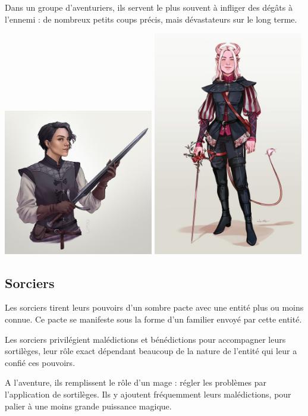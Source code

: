 \documentclass[10pt,a4paper]{book}
\begin{document}
Dans un groupe d'aventuriers, ils servent le plus souvent à infliger des dégâts à l'ennemi : de nombreux petits coups précis, mais dévastateurs sur le long terme.

\includegraphics[width=0.49\textwidth]{bretteru 1}
\includegraphics[width=0.49\textwidth]{bretteur 2}
\subsection{Sorciers}
Les sorciers tirent leurs pouvoirs d'un sombre pacte avec une entité plus ou moins connue. Ce pacte se manifeste sous la forme d'un familier envoyé par cette entité.

Les sorciers privilégient malédictions et bénédictions pour accompagner leurs sortilèges, leur rôle exact dépendant beaucoup de la nature de l'entité qui leur a confié ces pouvoirs.

A l'aventure, ils remplissent le rôle d'un mage : régler les problèmes par l'application de sortilèges. Ils y ajoutent fréquemment leurs malédictions, pour palier à une moins grande puissance magique.
\end{document}
